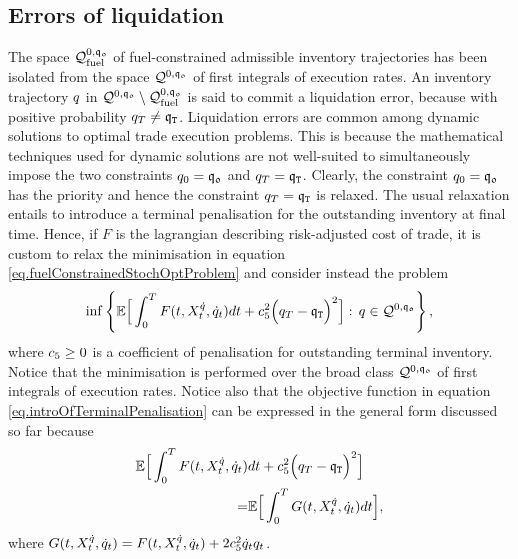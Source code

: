 \documentclass[10pt,a4paper]{article}
\begin{document}
	
	\subsection{Errors of liquidation}\label{sec.errorsOfLiquidation}
	The space $\mathcal{Q}_{\text{fuel}}^{0,\mathfrak{q_0}}$ of fuel-constrained admissible inventory trajectories has been isolated from the space $\mathcal{Q}^{0,\mathfrak{q_0}}$ of first integrals of execution rates. An inventory trajectory $q$ in $\mathcal{Q}^{0,\mathfrak{q_0}}\setminus \mathcal{Q}_{\text{fuel}}^{0,\mathfrak{q_0}}$ is said to commit a liquidation error, because with positive probability $q_T \neq \mathfrak{q}_{\mathtt{T} }$. Liquidation errors are common among dynamic solutions to optimal trade execution problems. This is because the mathematical techniques used for dynamic solutions are not well-suited to simultaneously impose the two constraints $q_0 = \mathfrak{q_0}$ and $q_T = \mathfrak{q}_{\mathtt{T} }$. Clearly, the constraint $q_0 = \mathfrak{q_0}$ has the priority and hence the constraint $q_T = \mathfrak{q}_{\mathtt{T} }$ is relaxed. The usual relaxation entails to introduce a terminal penalisation for the outstanding inventory at final time. Hence, if $F$ is the lagrangian describing risk-adjusted cost of trade, it is custom to relax the minimisation in equation \eqref{eq.fuelConstrainedStochOptProblem} and consider instead the problem
	\begin{equation}
	\label{eq.introOfTerminalPenalisation}
	\inf\left\lbrace
	\mathbb{{E}} \Big[
	\int_{0}^{T} F(t,X_t^{\dot{q}},\dot{q}_{t}) dt + c_{5}^{2} \Big(q_T - \mathfrak{q}_{\mathtt{T} }\Big)^{2}
	\Big] : \, 
	q \in \mathcal{Q}^{0,\mathfrak{q_0}}
	\right\rbrace,
	\end{equation}
	where $c_{5}\geq 0$ is a coefficient of penalisation for outstanding terminal inventory. Notice that the minimisation is performed over the broad class $\mathcal{Q}^{0,\mathfrak{q_0}}$ of first integrals of execution rates. Notice also that the objective function in equation \eqref{eq.introOfTerminalPenalisation} can be expressed in the general form discussed so far because 
	\begin{equation*}
	\begin{split}
	\mathbb{{E}} \Big[
	\int_{0}^{T} F(t,X_t^{\dot{q}},\dot{q}_{t}) &dt + c_{5}^{2} \Big(q_T - \mathfrak{q}_{\mathtt{T} }\Big)^{2}
	\Big] \\
	=& \mathbb{{E}} \Big[  \int_{0}^{T} G(t,X_t^{\dot{q}},\dot{q}_{t}) dt \Big],
	\end{split}
	\end{equation*}
	where $ G(t,X_t^{\dot{q}},\dot{q}_{t}) =  F(t,X_t^{\dot{q}},\dot{q}_{t}) + 2c_{5}^{2} \dot{q}_{t} q_t$. 
	
\end{document}
